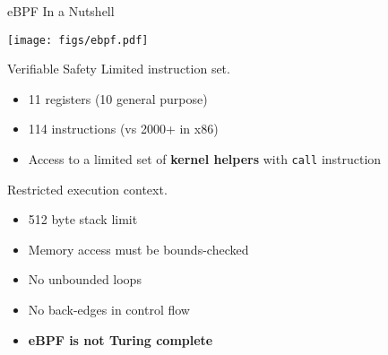 \documentclass[12pt, dvipsnames, aspectratio=169]{beamer}
\begin{document}

\begin{frame}[c]{eBPF In a Nutshell}
\begin{center}
  \color{black}
  \texttt{[image: figs/ebpf.pdf]}
\end{center}
\end{frame}

\begin{frame}[c]{Verifiable Safety}
Limited instruction set.
\begin{itemize}
    \item 11 registers (10 general purpose)
    \item 114 instructions (vs 2000+ in x86)
    \item Access to a limited set of \textbf{kernel helpers} with \texttt{call} instruction
\end{itemize}
\vfill
Restricted execution context.
\begin{itemize}
    \item 512 byte stack limit
    \item Memory access must be bounds-checked
    \item No unbounded loops
    \item No back-edges in control flow
    \item \textbf{eBPF is not Turing complete}
\end{itemize}
\end{frame}
\end{document}
